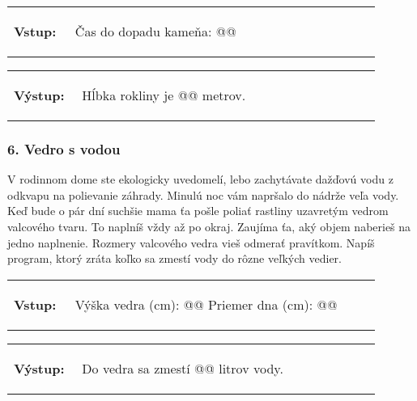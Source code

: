 \begin{tabular}{@{}p{0.15\linewidth}p{0.75\linewidth}}
\textbf{\small Vstup:} &
\vspace{-3em}
\begin{code}
Čas do dopadu kameňa: @\fbox{\phantom{vstup}}@
\end{code}
\end{tabular}

\vspace{-2em}
\begin{tabular}{@{}p{0.15\linewidth}p{0.75\linewidth}}
\textbf{\small Výstup:} &
\vspace{-3em}
\begin{code}
Hĺbka rokliny je @\fbox{\phantom{vstup}}@ metrov.
\end{code}
\end{tabular}
\vspace{-2em}

\subsubsection*{6. Vedro s vodou}
V rodinnom dome ste ekologicky uvedomelí, lebo zachytávate dažďovú vodu z odkvapu na polievanie záhrady. Minulú noc vám napršalo do nádrže veľa vody. Keď bude o pár dní suchšie mama ťa pošle poliať rastliny uzavretým vedrom valcového tvaru. To naplníš vždy až po okraj. Zaujíma ťa, aký objem naberieš na jedno naplnenie. Rozmery valcového vedra vieš odmerať pravítkom. Napíš program, ktorý zráta koľko sa zmestí vody do rôzne veľkých vedier.

\begin{tabular}{@{}p{0.15\linewidth}p{0.75\linewidth}}
\textbf{\small Vstup:} &
\vspace{-3em}
\begin{code}
Výška vedra (cm): @\fbox{\phantom{vstup}}@
Priemer dna (cm): @\fbox{\phantom{vstup}}@
\end{code}
\end{tabular}

\vspace{-2em}
\begin{tabular}{@{}p{0.15\linewidth}p{0.75\linewidth}}
\textbf{\small Výstup:} &
\vspace{-3em}
\begin{code}
Do vedra sa zmestí @\fbox{\phantom{vstup}}@ litrov vody.
\end{code}
\end{tabular}
\vspace{-2em}

